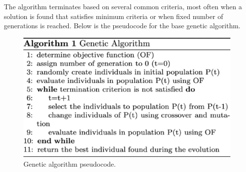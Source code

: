 \documentclass[12pt,a4paper,openany]{book}
\begin{document}
\noindent The algorithm terminates based on several common criteria, most often when a solution is found that satisfies minimum criteria or when fixed number of generations is reached. Below is the pseudocode for the base genetic algorithm. 

 \begin{figure}[ht!]
     \centering
     \includegraphics[scale=0.4]{figs/gen-algo-pseudo.eps}
     \caption{Genetic algorithm pseudocode.}\label{Fig:PROGAN}
 \end{figure}

% 

\end{document}
